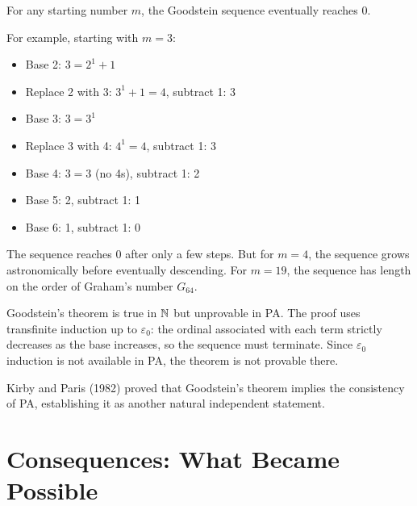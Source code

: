 \begin{theorem}
For any starting number $m$, the Goodstein sequence eventually reaches 0.
\end{theorem}

For example, starting with $m = 3$:
\begin{itemize}
\item Base 2: $3 = 2^1 + 1$
\item Replace 2 with 3: $3^1 + 1 = 4$, subtract 1: 3
\item Base 3: $3 = 3^1$
\item Replace 3 with 4: $4^1 = 4$, subtract 1: 3
\item Base 4: $3 = 3$ (no 4s), subtract 1: 2
\item Base 5: 2, subtract 1: 1
\item Base 6: 1, subtract 1: 0
\end{itemize}

The sequence reaches 0 after only a few steps. But for $m = 4$, the sequence grows astronomically before eventually descending. For $m = 19$, the sequence has length on the order of Graham's number $G_{64}$.

Goodstein's theorem is true in $\mathbb{N}$ but unprovable in PA. The proof uses transfinite induction up to $\varepsilon_0$: the ordinal associated with each term strictly decreases as the base increases, so the sequence must terminate. Since $\varepsilon_0$ induction is not available in PA, the theorem is not provable there.

Kirby and Paris (1982) proved that Goodstein's theorem implies the consistency of PA, establishing it as another natural independent statement.

\section{Consequences: What Became Possible}
\label{sec:godel:consequences}

